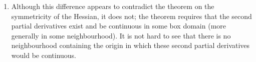 \documentclass[letterpaper,11pt]{article}
\begin{document}
\begin{enumerate}
\begin{enumerate}
            \item
                Although this difference appears to contradict the theorem on
                the symmetricity of the Hessian, it does not; the theorem
                requires that the second partial derivatives exist and be
                continuous in some box domain (more generally in some
                neighbourhood). It is not hard to see that there is no
                neighbourhood containing the origin in which these second
                partial derivatives would be continuous.
        \end{enumerate}
\end{enumerate}
\end{document}
